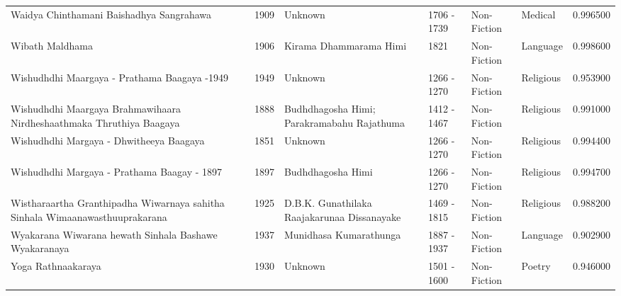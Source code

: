 \begin{tabular}{lrllllr}
Waidya Chinthamani Baishadhya Sangrahawa & 1909 & Unknown & 1706 - 1739 & Non-Fiction & Medical & 0.996500 \\
Wibath Maldhama & 1906 & Kirama Dhammarama Himi & 1821 & Non-Fiction & Language & 0.998600 \\
Wishudhdhi Maargaya - Prathama Baagaya -1949 & 1949 & Unknown & 1266 - 1270 & Non-Fiction & Religious & 0.953900 \\
Wishudhdhi Maargaya Brahmawihaara Nirdheshaathmaka Thruthiya Baagaya & 1888 & Budhdhagosha Himi; Parakramabahu Rajathuma & 1412 - 1467 & Non-Fiction & Religious & 0.991000 \\
Wishudhdhi Margaya - Dhwitheeya Baagaya & 1851 & Unknown & 1266 - 1270 & Non-Fiction & Religious & 0.994400 \\
Wishudhdhi Margaya - Prathama Baagay - 1897 & 1897 & Budhdhagosha Himi & 1266 - 1270 & Non-Fiction & Religious & 0.994700 \\
Wistharaartha Granthipadha Wiwarnaya sahitha Sinhala Wimaanawasthuuprakarana & 1925 & D.B.K. Gunathilaka Raajakarunaa Dissanayake & 1469 - 1815 & Non-Fiction & Religious & 0.988200 \\
Wyakarana Wiwarana hewath Sinhala Bashawe Wyakaranaya & 1937 & Munidhasa Kumarathunga & 1887 - 1937 & Non-Fiction & Language & 0.902900 \\
Yoga Rathnaakaraya & 1930 & Unknown & 1501 - 1600 & Non-Fiction & Poetry & 0.946000 \\
\bottomrule
\end{tabular}
